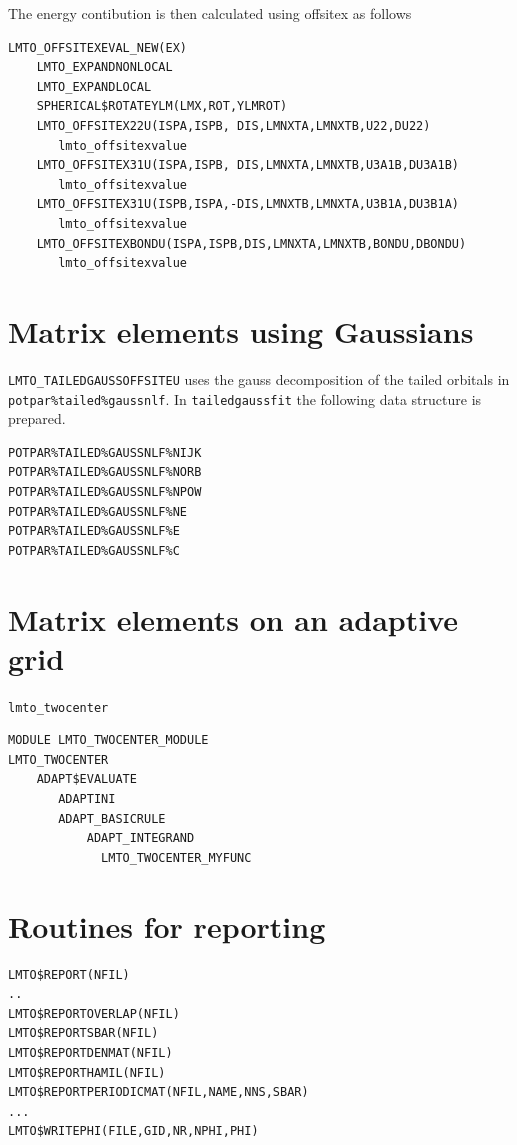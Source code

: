 \documentclass[11pt,a4paper]{report}
\begin{document}
The energy contibution is then calculated using offsitex as follows
\begin{verbatim}
LMTO_OFFSITEXEVAL_NEW(EX)  
    LMTO_EXPANDNONLOCAL
    LMTO_EXPANDLOCAL
    SPHERICAL$ROTATEYLM(LMX,ROT,YLMROT)
    LMTO_OFFSITEX22U(ISPA,ISPB, DIS,LMNXTA,LMNXTB,U22,DU22)
       lmto_offsitexvalue
    LMTO_OFFSITEX31U(ISPA,ISPB, DIS,LMNXTA,LMNXTB,U3A1B,DU3A1B)
       lmto_offsitexvalue
    LMTO_OFFSITEX31U(ISPB,ISPA,-DIS,LMNXTB,LMNXTA,U3B1A,DU3B1A)
       lmto_offsitexvalue
    LMTO_OFFSITEXBONDU(ISPA,ISPB,DIS,LMNXTA,LMNXTB,BONDU,DBONDU)
       lmto_offsitexvalue
\end{verbatim}

\section{Matrix elements using Gaussians}
\verb|LMTO_TAILEDGAUSSOFFSITEU| uses the gauss decomposition of the
tailed orbitals in \verb|potpar%tailed%gaussnlf|.  In
\verb|tailedgaussfit| the following data structure is prepared.
\begin{verbatim}
POTPAR%TAILED%GAUSSNLF%NIJK
POTPAR%TAILED%GAUSSNLF%NORB
POTPAR%TAILED%GAUSSNLF%NPOW
POTPAR%TAILED%GAUSSNLF%NE
POTPAR%TAILED%GAUSSNLF%E
POTPAR%TAILED%GAUSSNLF%C
\end{verbatim}




\section{Matrix elements on an adaptive grid}
\verb|lmto_twocenter|

\begin{verbatim}
MODULE LMTO_TWOCENTER_MODULE
LMTO_TWOCENTER
    ADAPT$EVALUATE
       ADAPTINI
       ADAPT_BASICRULE
           ADAPT_INTEGRAND
             LMTO_TWOCENTER_MYFUNC
\end{verbatim}


\section{Routines for reporting}
\begin{verbatim}
LMTO$REPORT(NFIL)
..
LMTO$REPORTOVERLAP(NFIL)
LMTO$REPORTSBAR(NFIL)
LMTO$REPORTDENMAT(NFIL)
LMTO$REPORTHAMIL(NFIL)
LMTO$REPORTPERIODICMAT(NFIL,NAME,NNS,SBAR)
...
LMTO$WRITEPHI(FILE,GID,NR,NPHI,PHI)
\end{verbatim}
\end{document}
